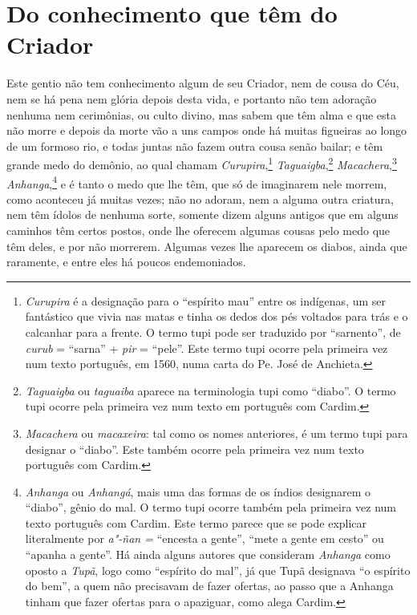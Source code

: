 \section{Do conhecimento que têm do Criador}
 Este gentio não tem conhecimento algum de seu Criador, nem de cousa do
Céu, nem se há pena nem glória depois desta vida, e portanto não tem
adoração nenhuma nem cerimônias, ou culto divino, mas sabem que têm
alma e que esta não morre e depois da morte vão a uns campos onde há
muitas figueiras ao longo de um formoso rio, e todas juntas não fazem
outra cousa senão bailar; e têm grande medo do demônio, ao qual chamam
\textit{Curupira},\footnote{ \textit{Curupira} é a designação para o
``espírito mau'' entre os indígenas, um ser fantástico que vivia nas
matas e tinha os dedos dos pés voltados para trás e o calcanhar para a
frente. O termo tupi pode ser traduzido por ``sarnento'', de
\textit{curub} = ``sarna'' + \textit{pir} = ``pele''. Este termo tupi
ocorre pela primeira vez num texto português, em 1560, numa
carta do Pe. José de Anchieta.} \textit{Taguaigba},\footnote{ \textit{Taguaigba} 
ou \textit{taguaiba} aparece na
terminologia tupi como ``diabo''. O termo tupi ocorre pela primeira vez
num texto em português com Cardim.} \textit{Macachera},\footnote{ \textit{Macachera} ou \textit{macaxeira}: tal como os
nomes anteriores, é um termo tupi para designar o ``diabo''. Este também
ocorre pela primeira vez num texto português com Cardim.} \textit{
Anhanga},\footnote{ \textit{Anhanga} ou \textit{Anhangá}, mais uma
das formas de os índios designarem o ``diabo'', gênio do mal. O termo
tupi ocorre também pela primeira vez num texto português com Cardim.
Este termo parece que se pode explicar literalmente por \textit{a"-ñan =}
``encesta a gente'', ``mete a gente em cesto'' ou ``apanha a gente''. Há
ainda alguns autores que consideram \textit{Anhanga} como oposto a
\textit{Tupã}, logo como ``espírito do mal'', já que Tupã designava ``o
espírito do bem'', a quem não precisavam de fazer ofertas, ao passo que
a Anhanga tinham que fazer ofertas para o apaziguar, como alega
Cardim.}  e é tanto o medo que lhe têm, que só de imaginarem
nele morrem, como aconteceu já muitas vezes; não no adoram, nem a
alguma outra criatura, nem têm ídolos de nenhuma sorte, somente dizem
alguns antigos que em alguns caminhos têm certos postos, onde lhe
oferecem algumas cousas pelo medo que têm deles, e por não morrerem.
Algumas vezes lhe aparecem os diabos, ainda que raramente, e entre eles
há poucos endemoniados.

